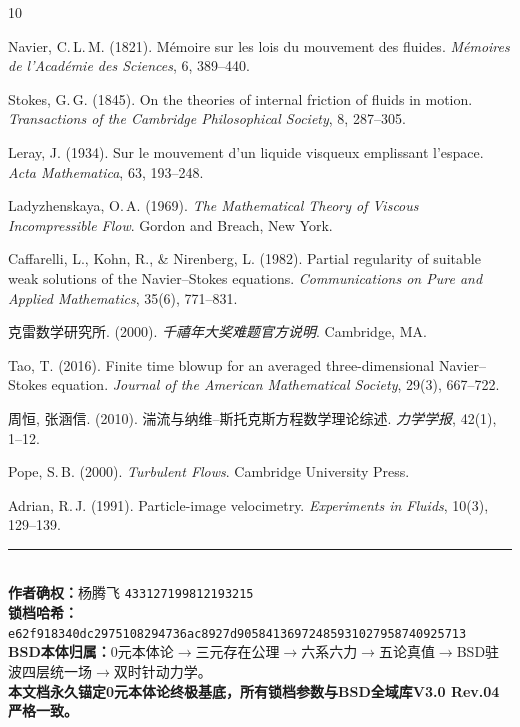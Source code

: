 \documentclass[11pt,a4paper]{ctexart}
\theoremstyle{remark}
\begin{document}
\begin{thebibliography}{10}

Navier, C.\,L.\,M. (1821). M\'emoire sur les lois du mouvement des fluides.
\textit{M\'emoires de l'Acad\'emie des Sciences}, 6, 389--440.

Stokes, G.\,G. (1845). On the theories of internal friction of fluids in motion.
\textit{Transactions of the Cambridge Philosophical Society}, 8, 287--305.

Leray, J. (1934). Sur le mouvement d'un liquide visqueux emplissant l'espace.
\textit{Acta Mathematica}, 63, 193--248.

Ladyzhenskaya, O.\,A. (1969). \textit{The Mathematical Theory of Viscous Incompressible Flow}.
Gordon and Breach, New York.

Caffarelli, L., Kohn, R., \& Nirenberg, L. (1982). Partial regularity of suitable weak solutions of the Navier--Stokes equations.
\textit{Communications on Pure and Applied Mathematics}, 35(6), 771--831.

克雷数学研究所. (2000). \textit{千禧年大奖难题官方说明}. Cambridge, MA.

Tao, T. (2016). Finite time blowup for an averaged three-dimensional Navier--Stokes equation.
\textit{Journal of the American Mathematical Society}, 29(3), 667--722.

周恒, 张涵信. (2010). 湍流与纳维--斯托克斯方程数学理论综述.
\textit{力学学报}, 42(1), 1--12.

Pope, S.\,B. (2000). \textit{Turbulent Flows}. Cambridge University Press.

Adrian, R.\,J. (1991). Particle-image velocimetry.
\textit{Experiments in Fluids}, 10(3), 129--139.

\end{thebibliography}

\vspace{1em}
\noindent\rule{\textwidth}{0.4pt}\\
\textbf{作者确权：}杨腾飞 \quad \texttt{433127199812193215}\\
\textbf{锁档哈希：} \texttt{e62f918340dc2975108294736ac8927d90584136972485931027958740925713}\\
\textbf{BSD本体归属：}0元本体论$\to$三元存在公理$\to$六系六力$\to$五论真值$\to$BSD驻波四层统一场$\to$双时针动力学。\\
\textbf{本文档永久锚定0元本体论终极基底，所有锁档参数与BSD全域库V3.0 Rev.04严格一致。}
\end{document}
